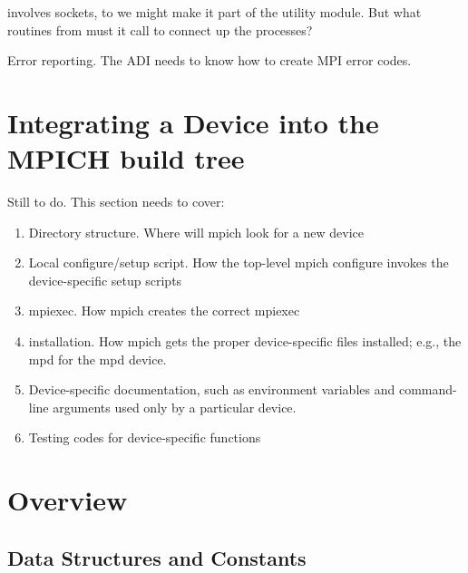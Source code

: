 \documentclass{article}
\begin{document}
 involves sockets, to we might make it part of the
utility module.  But what routines from  must it call
to connect up the processes?

Error reporting.  The ADI needs to know how to create MPI error codes.

%

%


\section{Integrating a Device into the MPICH build tree}
Still to do.  This section needs to cover:
\begin{enumerate}
\item Directory structure.  Where will mpich look for a new device
\item Local configure/setup script.  How the top-level mpich configure invokes
  the device-specific setup scripts
\item mpiexec.  How mpich creates the correct mpiexec
\item installation.  How mpich gets the proper device-specific files
  installed; e.g., the mpd for the mpd device.
\item Device-specific documentation, such as environment variables and
  command-line arguments used only by a particular device.
\item Testing codes for device-specific functions
\end{enumerate}

\mancontentstrue

\section{Overview}



\subsection{Data Structures and Constants}



\end{document}

